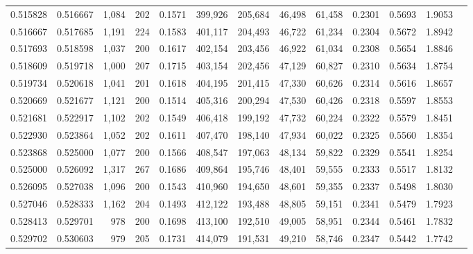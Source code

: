 \begin{tabular}{rrrrrrrrrrrrr}
0.515828 & 0.516667 &  1,084 &   202 &                                     0.1571 & 399,926 & 205,684 &  46,498 &  61,458 & 0.2301 & 0.5693 & 1.9053 \\
0.516667 & 0.517685 &  1,191 &   224 &                                     0.1583 & 401,117 & 204,493 &  46,722 &  61,234 & 0.2304 & 0.5672 & 1.8942 \\
0.517693 & 0.518598 &  1,037 &   200 &                                     0.1617 & 402,154 & 203,456 &  46,922 &  61,034 & 0.2308 & 0.5654 & 1.8846 \\
0.518609 & 0.519718 &  1,000 &   207 &                                     0.1715 & 403,154 & 202,456 &  47,129 &  60,827 & 0.2310 & 0.5634 & 1.8754 \\
0.519734 & 0.520618 &  1,041 &   201 &                                     0.1618 & 404,195 & 201,415 &  47,330 &  60,626 & 0.2314 & 0.5616 & 1.8657 \\
0.520669 & 0.521677 &  1,121 &   200 &                                     0.1514 & 405,316 & 200,294 &  47,530 &  60,426 & 0.2318 & 0.5597 & 1.8553 \\
0.521681 & 0.522917 &  1,102 &   202 &                                     0.1549 & 406,418 & 199,192 &  47,732 &  60,224 & 0.2322 & 0.5579 & 1.8451 \\
0.522930 & 0.523864 &  1,052 &   202 &                                     0.1611 & 407,470 & 198,140 &  47,934 &  60,022 & 0.2325 & 0.5560 & 1.8354 \\
0.523868 & 0.525000 &  1,077 &   200 &                                     0.1566 & 408,547 & 197,063 &  48,134 &  59,822 & 0.2329 & 0.5541 & 1.8254 \\
0.525000 & 0.526092 &  1,317 &   267 &                                     0.1686 & 409,864 & 195,746 &  48,401 &  59,555 & 0.2333 & 0.5517 & 1.8132 \\
0.526095 & 0.527038 &  1,096 &   200 &                                     0.1543 & 410,960 & 194,650 &  48,601 &  59,355 & 0.2337 & 0.5498 & 1.8030 \\
0.527046 & 0.528333 &  1,162 &   204 &                                     0.1493 & 412,122 & 193,488 &  48,805 &  59,151 & 0.2341 & 0.5479 & 1.7923 \\
0.528413 & 0.529701 &    978 &   200 &                                     0.1698 & 413,100 & 192,510 &  49,005 &  58,951 & 0.2344 & 0.5461 & 1.7832 \\
0.529702 & 0.530603 &    979 &   205 &                                     0.1731 & 414,079 & 191,531 &  49,210 &  58,746 & 0.2347 & 0.5442 & 1.7742 \\

\end{tabular}
